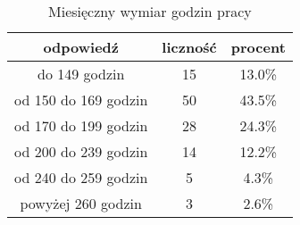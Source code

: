 \begin{table}[H]
\caption{Miesięczny wymiar godzin pracy}
\centering
\begin{tabular}{ | c | c | c |}
\hline
odpowiedź & liczność & procent\\
\hline
do 149 godzin  &  15  & 13.0\% \\
\hline
od 150 do 169 godzin  &  50  & 43.5\% \\
\hline
od 170 do 199 godzin  &  28  & 24.3\% \\
\hline
od 200 do 239 godzin  &  14  & 12.2\% \\
\hline
od 240 do 259 godzin  &  5  & 4.3\% \\
\hline
powyżej 260 godzin  &  3  & 2.6\% \\
\hline
\end{tabular}
\label{tab:Q3}
\end{table}

